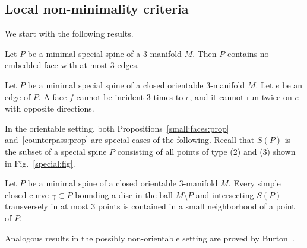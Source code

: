 \documentclass[10pt]{article}      %
\begin{document}
\subsection{Local non-minimality criteria} \label{criteria:subsection}
We start with the following results.
\begin{proposition} \label{small:faces:prop}
Let $P$ be a minimal special spine of a 3-manifold $M$. Then $P$ contains no embedded
face with at most $3$ edges.
\end{proposition}
\begin{proposition} \label{counterpass:prop}
Let $P$ be a minimal special spine of a closed orientable 3-manifold $M$.
Let $e$ be an edge of $P$.
A face $f$ cannot be incident $3$ times to $e$, and it cannot run twice on $e$ with opposite
directions.
\end{proposition}
In the orientable setting, both Propositions~\ref{small:faces:prop} and~\ref{counterpass:prop}
are special cases of the following. Recall that $S(P)$ is the subset of a special spine $P$
consisting of all points of type (2) and (3) shown in Fig.~\ref{special:fig}.
\begin{proposition}
Let $P$ be a minimal spine of a closed orientable 3-manifold $M$. 
Every simple closed curve
$\gamma\subset P$ bounding a disc in the ball $M\setminus P$ and intersecting $S(P)$
transversely in at most $3$ points is contained in a small neighborhood of a point of $P$.
\end{proposition}
Analogous results in the possibly non-orientable setting are proved by Burton~\cite{Bu:graphs}.
\end{document}
